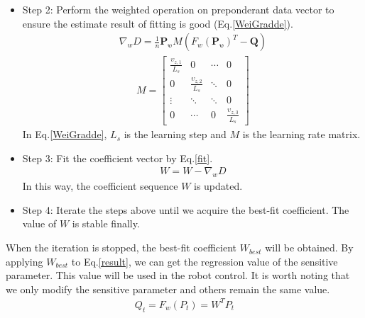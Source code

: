 \begin{itemize}
	\item Step 2: Perform the weighted operation on preponderant data vector to ensure the estimate result of fitting is good (Eq.\ref{WeiGradde}).
	\begin{eqnarray}
	\nabla_{w}D=\frac{1}{n}\bm{P_{\upsilon}}M(F_{w}(\bm{P_{\upsilon}})^{T}-\bm{Q})
	\end{eqnarray}
	\begin{eqnarray}\label{WeiGradde}
	M=\begin{bmatrix}
	\frac{\upsilon_{z,1}}{L_{s}}&0&\cdots&0\\
	0&\frac{\upsilon_{z,2}}{L_{s}}&\ddots&0\\
	\vdots&\ddots&\ddots&0\\
	0&\cdots&0&\frac{\upsilon_{z,3}}{L_{s}}
	\end{bmatrix}
	\end{eqnarray}
	In Eq.\ref{WeiGradde}, $L_s$ is the learning step and $M$ is the learning rate matrix.
	
	\item Step 3: Fit the coefficient vector by Eq.\ref{fit}.
	\begin{eqnarray}\label{fit}
	W=W-\nabla_{w}D
	\end{eqnarray}
	In this way, the coefficient sequence $W$ is updated.
	
	\item Step 4: Iterate the steps above until we acquire the best-fit coefficient. The value of $W$ is stable finally.
\end{itemize}

When the iteration is stopped, the best-fit coefficient $W_{best}$ will be obtained. By applying $W_{best}$ to Eq.\ref{result}, we can get the regression value of the sensitive parameter. This value will be used in the robot control. It is worth noting that we only modify the sensitive parameter and others remain the same value.
\begin{eqnarray}\label{result}
Q_{t} = F_{w}(P_{t})=W^{T}P_{t}
\end{eqnarray}